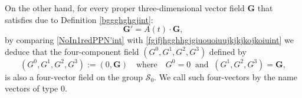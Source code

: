 \documentclass{article}
\theoremstyle{definition}
\theoremstyle{remark}
\renewcommand{\vec}[1]{\mathbf{#1}}
\newcommand{\er}{\eqref}
\newcommand{\er}{\eqref}
\begin{document}
On the other hand, for every proper three-dimensional vector field
$\vec G$ that satisfies due to Definition \ref{bggghghgjint}:
\begin{equation}
\label{NoIn1redPPN'int}\vec G'=A(t)\cdot\vec G,
\end{equation}
by comparing \er{NoIn1redPPN'int} with
\er{fgjfjhgghhgjgiuouoiuujkjkjkojkoiuint} we deduce that the
four-component field $(G^0,G^1,G^2,G^3)$ defined by
\begin{equation}\label{fgjfjhgghhgjghjhjijhojihjhjjijhjjjjjuiiklkllo;int}
(G^0,G^1,G^2,G^3):=\left(0,\vec G\right)\quad\text{where}\quad
G^0=0\;\;\text{and}\;\;(G^1,G^2,G^3)=\vec G,
\end{equation}
is also a four-vector field on the group $\mathcal{S}_0$.  We call
such four-vectors by the name vectors of type $0$.
\end{document}
